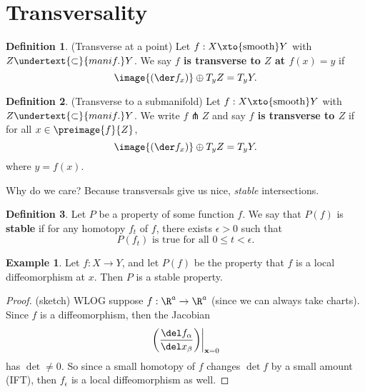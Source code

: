 \documentclass[a5paper]{article}
\theoremstyle{definition}%
\newtheorem*{definition*}{Definition}
\newtheorem*{example*}{Example}
\numberwithin{exercise}{section}
\theoremstyle{remark}%
\renewcommand{\emph}{\textbf}
\begin{document}
\section{Transversality}

\begin{definition*}
(Transverse at a point) Let $f:X\xto{\text{smooth}} Y$ with $Z\undertext{\subset}{manif.} Y$. We say \emph{$f$ is transverse to $Z$ at $f(x)=y$} if 
$$\image{(\der f_x)}\oplus T_y Z=T_y Y.$$
\end{definition*}

\begin{highlight}
\begin{definition*}
(Transverse to a submanifold) Let $f:X\xto{\text{smooth}} Y$ with $Z\undertext{\subset}{manif.} Y$. We write $f\pitchfork Z$ and say \emph{$f$ is transverse to $Z$} if for all $x\in\preimage{f}{Z}$, 
$$\image{(\der f_x)}\oplus T_y Z=T_y Y.$$
where $y=f(x)$. 
\end{definition*}
\end{highlight}



Why do we care? Because transversals give us nice, \textit{stable} intersections. 

\begin{highlight}
\begin{definition*}
Let $P$ be a property of some function $f$. We say that $P(f)$ is \emph{stable} if for any homotopy $f_t$ of $f$, there exists $\epsilon>0$ such that 
$$P(f_t)\text{ is true for all }0\leq t<\epsilon.$$
\end{definition*}
\end{highlight}

\begin{example*}
Let $f:X\to Y$, and let $P(f)$ be the property that $f$ is a local diffeomorphism at $x$. Then $P$ is a stable property. 
\end{example*}
\begin{proof} (sketch) WLOG suppose $f:\R^a\to\R^a$ (since we can always take charts). Since $f$ is a diffeomorphism, then the Jacobian 
$$\left.\left( \frac{\del f_\alpha}{\del x_\beta}\right)\right|_{\mathbf{x}=0} $$
has $\det\neq0$. So since a small homotopy of $f$ changes $\det f$ by a small amount (IFT), then $f_\epsilon$ is a local diffeomorphism as well. 
\end{proof}
\end{document}
